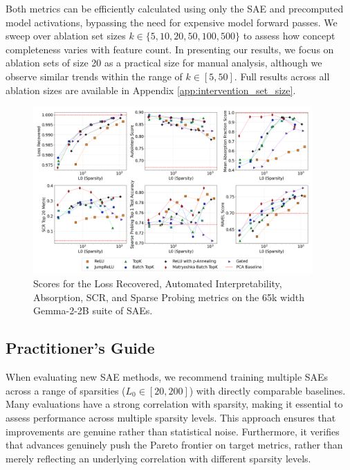 \documentclass{article}
\theoremstyle{plain}
\theoremstyle{definition}
\theoremstyle{remark}
\begin{document}
Both metrics can be efficiently calculated using only the SAE and precomputed model activations, bypassing the need for expensive model forward passes. We sweep over ablation set sizes $k \in \{5, 10, 20, 50, 100, 500\}$ to assess how concept completeness varies with feature count. In presenting our results, we focus on ablation sets of size 20 as a practical size for manual analysis, although we observe similar trends within the range of $k \in [5, 50]$. Full results across all ablation sizes are available in Appendix \ref{app:intervention_set_size}.

\begin{figure}[t]
\centering
    \includegraphics[width=0.95\textwidth]
    {images/plot_2x3_sae_bench_gemma-2-2b_65k_architecture_series_layer_12.png}
    \caption{Scores for the Loss Recovered, Automated Interpretability, Absorption, SCR, and Sparse Probing metrics on the 65k width Gemma-2-2B suite of SAEs.}
    \label{fig:2x3_65k_plot}
\end{figure}

\subsection{Practitioner's Guide}

When evaluating new SAE methods, we recommend training multiple SAEs across a range of sparsities ($L_0 \in [20, 200]$) with directly comparable baselines. Many evaluations have a strong correlation with sparsity, making it essential to assess performance across multiple sparsity levels. This approach ensures that improvements are genuine rather than statistical noise. Furthermore, it verifies that advances genuinely push the Pareto frontier on target metrics, rather than merely reflecting an underlying correlation with different sparsity levels.
\end{document}
